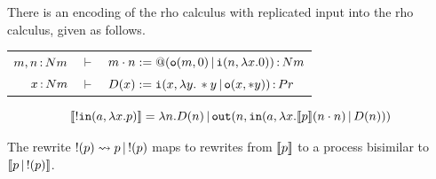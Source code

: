 \documentclass{article}
\begin{document}



\newpage

\begin{proposition}
    There is an encoding of the rho calculus with replicated input into the rho calculus, given as follows.

    \begin{center}
        \renewcommand{\arraystretch}{1.2}
        \begin{tabular}{rcl}
            $m,n\,{:}\, Nm$ & $\vdash$ & $m\cdot n := @(\mathtt{o}(m,0)\,|\, \mathtt{i}(n,\lambda x.0))\,{:}\, Nm$\\
            $x\,{:}\, Nm$ & $\vdash$ & $D(x) := \mathtt{i}(x,\lambda y.\, \ast y \,|\, \mathtt{o}(x,\ast y))\,{:}\, Pr$
        \end{tabular}
    \end{center}

    \[[\![!\mathtt{in}(a,\lambda x.p)]\!] = \lambda n. D(n)\,|\, \mathtt{out}(n, \mathtt{in}(a, \lambda x. [\![p]\!](n\cdot n)\,|\, D(n)))\]
\end{proposition}

The rewrite $!(p)\rightsquigarrow p\,|\, !(p)$ maps to rewrites from $[\![p]\!]$ to a process bisimilar to $[\![p\,|\, !(p)]\!]$.
\end{document}
